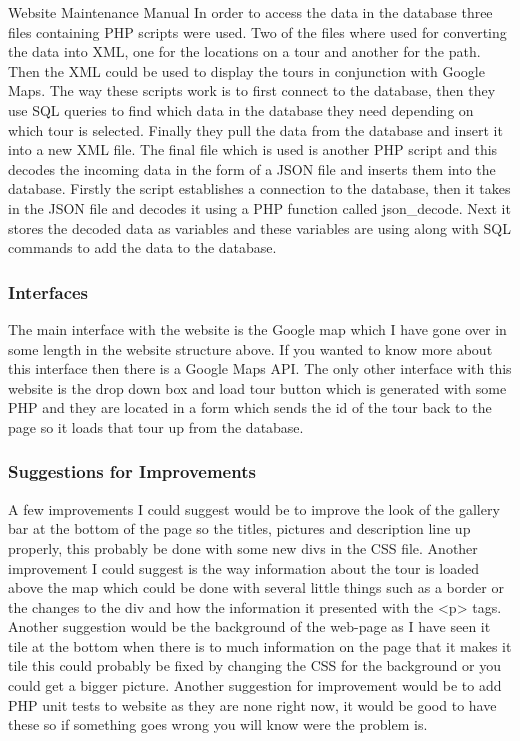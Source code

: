 \documentclass{article}
\begin{document}
\begin{section}{Website Maintenance Manual}
		In order to access the data in the database three files containing PHP scripts were used. Two of the files where used for converting the data into XML, one for the locations on a tour and another for the path. Then the XML could be used to display the tours in conjunction with Google Maps. The way these scripts work is to first connect to the database, then they use SQL queries to find which data in the database they need depending on which tour is selected. Finally they pull the data from the database and insert it into a new XML file. The final file which is used is another PHP script and this decodes the incoming data in the form of a JSON file and inserts them into the database. Firstly the script establishes a connection to the database, then it takes in the JSON file and decodes it using a PHP function called json\_decode. Next it stores the decoded data as variables and these variables are using along with SQL commands to add the data to the database. 

		\subsubsection{Interfaces}
		The main interface with the website is the Google map which I have gone over in some length in the website structure above. If you wanted to know more about this interface then there is a Google Maps API. The only other interface with this website is the drop down box and load tour button which is generated with some PHP and they are located in a form which sends the id of the tour back to the page so it loads that tour up from the database.

		\subsubsection{Suggestions for Improvements}
		A few improvements I could suggest would be to improve the look of the gallery bar at the bottom of the page so the titles, pictures and description line up properly, this probably be done with some new divs in the CSS file. Another improvement I could suggest  is the way information about the tour is loaded above the map which could be done with several little things such as a border or the changes to the div and how the information it presented with the <p> tags. Another suggestion would be the background of the web-page as I have seen it tile at the bottom when there is to much information on the page that it makes it tile this could probably be fixed by changing the CSS for the background or you could get a bigger picture.
		Another suggestion for improvement would be to add PHP unit tests to website as they are none right now, it would be good to have these so if something goes wrong you will know were the problem is.



\end{section}
\end{document}
